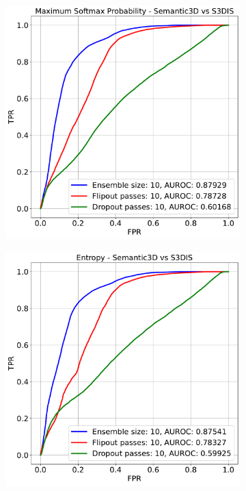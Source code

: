    \begin{figure}[h!]
        \begin{subfigure}{0.49\textwidth}
            \includegraphics[scale=0.32]{images/AUROC/MSP_10.pdf}
            \caption{}
            \label{fig:roc_msp_10_ood_1}
        \end{subfigure}
        \begin{subfigure}{0.495\textwidth}
            \includegraphics[scale=0.32]{images/AUROC/Entropy_10.pdf}

\end{subfigure}
\end{figure}
